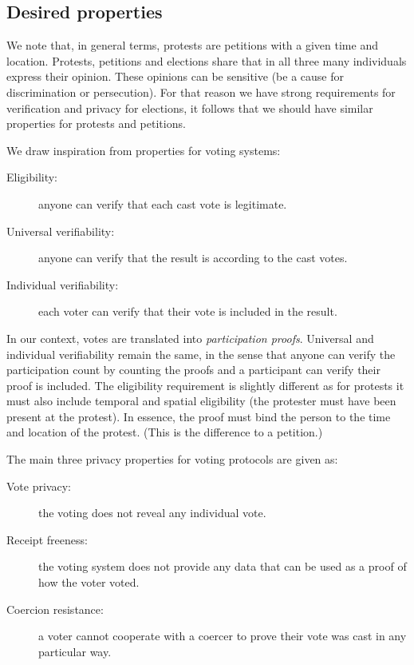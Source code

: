 \subsection{Desired properties}%
\label{desired-properties}

We note that, in general terms, protests are petitions with a given time and 
location.
Protests, petitions and elections share that in all three many individuals 
express their opinion.
These opinions can be sensitive (\eg be a cause for discrimination or 
persecution).
For that reason we have strong requirements for verification and privacy for 
elections, it follows that we should have similar properties for protests
and petitions.

We draw inspiration from properties for voting systems:
\begin{description}
  \item[Eligibility:] anyone can verify that each cast vote is legitimate.
  \item[Universal verifiability:] anyone can verify that the result is according to the cast votes.
  \item[Individual verifiability:] each voter can verify that their vote is 
    included in the result.
\end{description}
In our context, votes are translated into \emph{participation proofs}.
Universal and individual verifiability remain the same, in the sense that anyone can verify the participation count by counting the proofs and a participant can verify their proof is included.
The eligibility requirement is slightly different as for protests it must also
include temporal %
and spatial eligibility (\ie the protester must have been present at the 
protest).
In essence, the proof must bind the person to the time and location of the protest.
(This is the difference to a petition.)

The main three privacy properties for voting protocols are given as:
\begin{description}
  \item[Vote privacy:] the voting does not reveal any individual vote.
  \item[Receipt freeness:] the voting system does not provide any data that can be used as a proof of how the voter voted.
  \item[Coercion resistance:] a voter cannot cooperate with a coercer to prove their vote was cast in any particular way.
\end{description}


